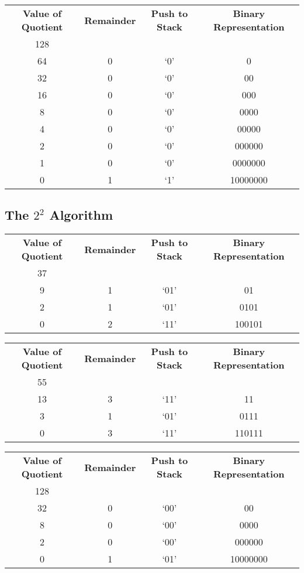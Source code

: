\documentclass[12pt]{article}
\begin{document}
\begin{center}
  \begin{tabular}{c|c|c|c}
    \textbf{Value of Quotient} & \textbf{Remainder} & \textbf{Push to Stack} & \textbf{Binary Representation} \\
    128 &   &     & \\
    64  & 0 & `0' & 0 \\
    32  & 0 & `0' & 00 \\
    16  & 0 & `0' & 000 \\
    8   & 0 & `0' & 0000 \\
    4   & 0 & `0' & 00000 \\
    2   & 0 & `0' & 000000 \\
    1   & 0 & `0' & 0000000 \\
    0   & 1 & `1' & 10000000
  \end{tabular}
\end{center}

\subsection{The $2^2$ Algorithm}
\begin{center}
  \begin{tabular}{c|c|c|c}
    \textbf{Value of Quotient} & \textbf{Remainder} & \textbf{Push to Stack} & \textbf{Binary Representation} \\
    37 &   &      & \\
    9  & 1 & `01' & 01 \\
    2  & 1 & `01' & 0101 \\
    0  & 2 & `11' & 100101
  \end{tabular}
\end{center}

\begin{center}
  \begin{tabular}{c|c|c|c}
    \textbf{Value of Quotient} & \textbf{Remainder} & \textbf{Push to Stack} & \textbf{Binary Representation} \\
    55 &   &      & \\
    13 & 3 & `11' & 11 \\
    3  & 1 & `01' & 0111 \\
    0  & 3 & `11' & 110111
  \end{tabular}
\end{center}

\begin{center}
  \begin{tabular}{c|c|c|c}
    \textbf{Value of Quotient} & \textbf{Remainder} & \textbf{Push to Stack} & \textbf{Binary Representation} \\
    128 &   &      & \\
    32  & 0 & `00' & 00 \\
    8   & 0 & `00' & 0000 \\
    2   & 0 & `00' & 000000 \\
    0   & 1 & `01' & 10000000
  \end{tabular}
\end{center}
\end{document}
